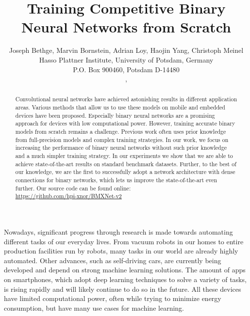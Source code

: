 \documentclass[10pt,twocolumn,letterpaper]{article}
\begin{document}
\title{Training Competitive Binary Neural Networks from Scratch}

\author{Joseph Bethge\footnotemark[1] , Marvin Bornstein\footnotemark[2] , Adrian Loy\footnotemark[2] , Haojin Yang\footnotemark[1] , Christoph Meinel\footnotemark[1]  \\
Hasso Plattner Institute, University of Potsdam, Germany\\
P.O. Box 900460, Potsdam D-14480\\
, 
}

\maketitle

\begin{abstract}

Convolutional neural networks have achieved astonishing results in different application areas.
Various methods that allow us to use these models on mobile and embedded devices have been proposed.
Especially binary neural networks are a promising approach for devices with low computational power.
However, training accurate binary models from scratch remains a challenge.
Previous work often uses prior knowledge from full-precision models and complex training strategies.
In our work, we focus on increasing the performance of binary neural networks without such prior knowledge and a much simpler training strategy.
In our experiments we show that we are able to achieve state-of-the-art results on standard benchmark datasets.
Further, to the best of our knowledge, we are the first to successfully adopt a network architecture with dense connections for binary networks, which lets us improve the state-of-the-art even further.
Our source code can be found online: \\
\url{https://github.com/hpi-xnor/BMXNet-v2}
\end{abstract}


Nowadays, significant progress through research is made towards automating different tasks of our everyday lives.
From vacuum robots in our homes to entire production facilities run by robots, many tasks in our world are already highly automated.
Other advances, such as self-driving cars, are currently being developed and depend on strong machine learning solutions.
The amount of apps on smartphones, which adopt deep learning techniques to solve a variety of tasks, is rising rapidly and will likely continue to do so in the future.
All these devices have limited computational power, often while trying to minimize energy consumption, but have many use cases for machine learning. %
\end{document}
